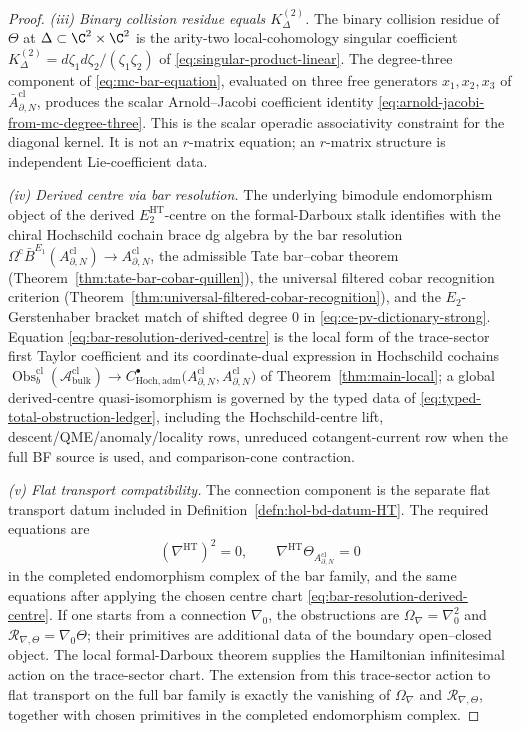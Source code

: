 \begin{proof}
\emph{(iii) Binary collision residue equals \(K^{(2)}_\Delta\).}
The binary collision residue of \(\Theta\) at \(\Delta\subset
\C^2\times\C^2\) is the arity-two local-cohomology singular coefficient
\(K^{(2)}_\Delta=d\zeta_1d\zeta_2/(\zeta_1\zeta_2)\) of
\eqref{eq:singular-product-linear}.  The degree-three component of
\eqref{eq:mc-bar-equation}, evaluated on three free generators
\(x_1,x_2,x_3\) of \(\bar A^{\mathrm{cl}}_{\partial,N}\), produces the
scalar Arnold--Jacobi coefficient identity
\eqref{eq:arnold-jacobi-from-mc-degree-three}.  This is the scalar
operadic associativity constraint for the diagonal kernel.  It is not an
\(r\)-matrix equation; an \(r\)-matrix structure is independent
Lie-coefficient data.

\emph{(iv) Derived centre via bar resolution.}
The underlying bimodule endomorphism object of the derived
\(E_2^{\mathrm{HT}}\)-centre on the formal-Darboux stalk
identifies with the chiral Hochschild cochain brace dg algebra by the
bar resolution
\(\Omega^{\mathrm{c}}\bar B^{E_1}(A^{\mathrm{cl}}_{\partial,N})
\to A^{\mathrm{cl}}_{\partial,N}\), the admissible Tate bar--cobar
theorem (Theorem~\ref{thm:tate-bar-cobar-quillen}), the universal
filtered cobar recognition criterion
(Theorem~\ref{thm:universal-filtered-cobar-recognition}), and the
\(E_2\)-Gerstenhaber bracket match of shifted degree \(0\) in
\eqref{eq:ce-pv-dictionary-strong}.  Equation
\eqref{eq:bar-resolution-derived-centre} is the local form of the
trace-sector first Taylor coefficient and its coordinate-dual expression
in Hochschild cochains
		\(\operatorname{Obs}^{\mathrm{cl}}_b(\mathcal A^{\mathrm{cl}}_{\mathrm{bulk}})\to
		C^\bullet_{\mathrm{Hoch},\mathrm{adm}}\!\bigl(A^{\mathrm{cl}}_{\partial,N},
		A^{\mathrm{cl}}_{\partial,N}\bigr)\) of
Theorem~\ref{thm:main-local}; a global derived-centre quasi-isomorphism
is governed by the typed data of \eqref{eq:typed-total-obstruction-ledger},
including the Hochschild-centre lift, descent/QME/anomaly/locality rows,
unreduced cotangent-current row when the full BF source is used, and
comparison-cone contraction.

\emph{(v) Flat transport compatibility.}
The connection component is the separate flat transport datum included in
Definition~\ref{defn:hol-bd-datum-HT}.  The required equations are
\[
  (\nabla^{\mathrm{HT}})^2=0,\qquad
  \nabla^{\mathrm{HT}}\Theta_{A^{\mathrm{cl}}_{\partial,N}}=0
\]
in the completed endomorphism complex of the bar family, and the same
equations after applying the chosen centre chart
\eqref{eq:bar-resolution-derived-centre}.  If one starts from a
connection \(\nabla_0\), the obstructions are
\(\Omega_{\nabla}=\nabla_0^2\) and
\(\mathcal R_{\nabla,\Theta}=\nabla_0\Theta\); their primitives are
additional data of the boundary open--closed object.  The local
formal-Darboux theorem supplies the Hamiltonian infinitesimal action on
the trace-sector chart.  The extension from this trace-sector action to
flat transport on the full bar family is exactly the vanishing of
\(\Omega_{\nabla}\) and \(\mathcal R_{\nabla,\Theta}\), together with
chosen primitives in the completed endomorphism complex.


\end{proof}
